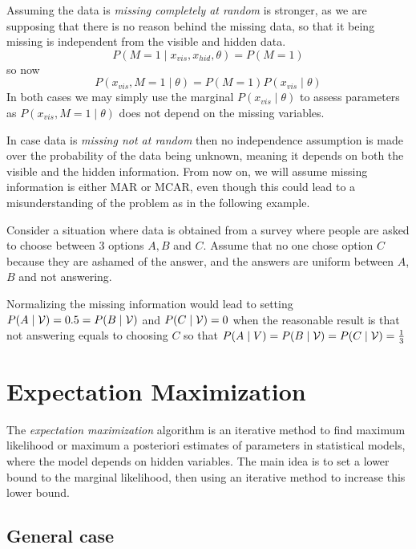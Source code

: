 Assuming the data is \emph{missing completely at random} is stronger, as we are supposing that there is no reason behind the missing data, so that it being missing is independent from the visible and hidden data.
\[
  P(M = 1 \mid x_{vis}, x_{hid}, \theta) = P(M = 1)
\]
so now
\[
    P( x_{vis}, M = 1 \mid \theta) = P(M = 1)P( x_{vis} \mid \theta)
\]
In both cases we may simply use the marginal \(P(x_{vis} \mid \theta)\) to assess parameters as \(P( x_{vis}, M = 1 \mid \theta)\) does not depend on the missing variables.

In case data is \emph{missing not at random} then no independence assumption is made over the probability of the data being unknown, meaning it depends on both the visible and the hidden information. From now on, we will assume missing information is either MAR or MCAR, even though this could lead to a misunderstanding of the problem as in the following example.

\begin{exampleth}
  Consider a situation where data is obtained from a survey where people are asked to choose between 3 options \(A, B\) and \(C\). Assume that no one chose option \(C\) because they are ashamed of the answer, and the answers are uniform between \(A\), \(B\) and not answering.

  Normalizing the missing information would lead to setting \(P(A \mid \mathcal{V}) = 0.5 = P(B \mid \mathcal{V})\) and \(P(C \mid \mathcal{V}) = 0\) when the reasonable result is that not answering equals to choosing \(C\) so that \(P(A \mid V) = P(B \mid \mathcal{V}) = P(C \mid \mathcal{V}) = \frac{1}{3}\)
\end{exampleth}

\section{Expectation Maximization}

The \emph{expectation maximization} algorithm is an iterative method to find maximum likelihood or maximum a posteriori estimates of parameters in statistical models, where the model depends on hidden variables. The main idea is to set a lower bound to the marginal likelihood, then using an iterative method to increase this lower bound.

\subsection{General case}

